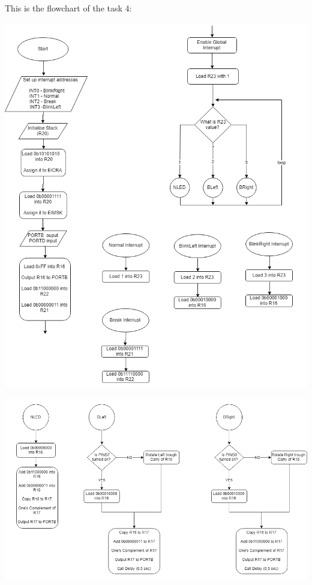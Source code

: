 \documentclass[a4paper,12pt]{article}
\begin{document}
\newpage
This is the flowchart of the task 4:
\begin{center}
\includegraphics[scale=1]{img/Task4-1.png}
\end{center}
\begin{center}
\includegraphics[scale=0.8]{img/Task4-2.png}
\end{center}


\end{document}
